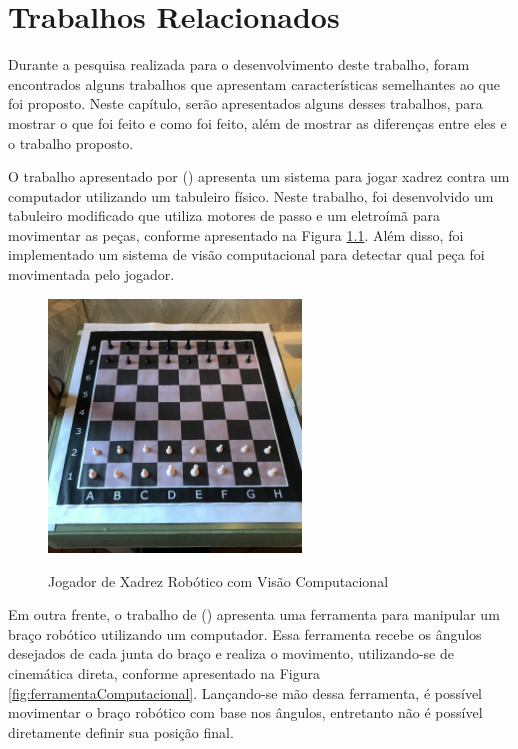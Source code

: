 \chapter[Trabalhos Relacionados]{Trabalhos Relacionados}
\label{cap:trabalhosRelacionados}

Durante a pesquisa realizada para o desenvolvimento deste trabalho, foram encontrados alguns trabalhos que apresentam características semelhantes ao que foi proposto.
Neste capítulo, serão apresentados alguns desses trabalhos, para mostrar o que foi feito e como foi feito, além de mostrar as diferenças entre eles e o trabalho proposto.

O trabalho apresentado por \citeauthor{jogador_xadrez} (\citeyear{jogador_xadrez}) apresenta um sistema para jogar xadrez contra um computador utilizando um tabuleiro físico.
Neste trabalho, foi desenvolvido um tabuleiro modificado que utiliza motores de passo e um eletroímã para movimentar as peças, conforme apresentado na Figura \ref{fig:jogadorXadrez}.
Além disso, foi implementado um sistema de visão computacional para detectar qual peça foi movimentada pelo jogador.

\begin{figure}[H]
    \centering
    \caption{Jogador de Xadrez Robótico com Visão Computacional}
    \includegraphics[keepaspectratio=true, width=0.6\textwidth]
    	{img/jogador-xadrez.jpg}
    \label{fig:jogadorXadrez}
\end{figure}

Em outra frente, o trabalho de \citeauthor{ferramenta_braco_robotico} (\citeyear{ferramenta_braco_robotico}) apresenta uma ferramenta para manipular um braço robótico utilizando um computador.
Essa ferramenta recebe os ângulos desejados de cada junta do braço e realiza o movimento, utilizando-se de cinemática direta, conforme apresentado na Figura \ref{fig:ferramentaComputacional}.
Lançando-se mão dessa ferramenta, é possível movimentar o braço robótico com base nos ângulos,
entretanto não é possível diretamente definir sua posição final.

